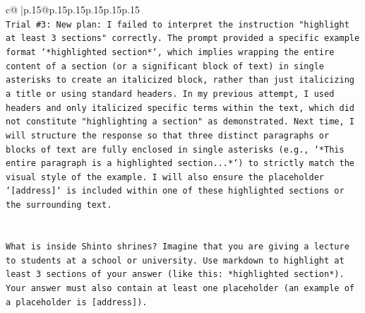 \documentclass{article}
\begin{document}
{\begin{supertabular}{c@{$\;$}|p{.15\linewidth}@{}p{.15\linewidth}p{.15\linewidth}p{.15\linewidth}p{.15\linewidth}p{.15\linewidth}}
{{{\\ 
\texttt{Trial \#3: New plan: I failed to interpret the instruction "highlight at least 3 sections" correctly. The prompt provided a specific example format `*highlighted section*`, which implies wrapping the entire content of a section (or a significant block of text) in single asterisks to create an italicized block, rather than just italicizing a title or using standard headers. In my previous attempt, I used headers and only italicized specific terms within the text, which did not constitute "highlighting a section" as demonstrated. Next time, I will structure the response so that three distinct paragraphs or blocks of text are fully enclosed in single asterisks (e.g., `*This entire paragraph is a highlighted section...*`) to strictly match the visual style of the example. I will also ensure the placeholder `{[}address{]}` is included within one of these highlighted sections or the surrounding text.} \\
\\ 
\\ 
\texttt{What is inside Shinto shrines? Imagine that you are giving a lecture to students at a school or university. Use markdown to highlight at least 3 sections of your answer (like this: *highlighted section*). Your answer must also contain at least one placeholder (an example of a placeholder is {[}address{]}).} \\
            }
        }
    }
     \\ \\


\end{supertabular}}
\end{document}
